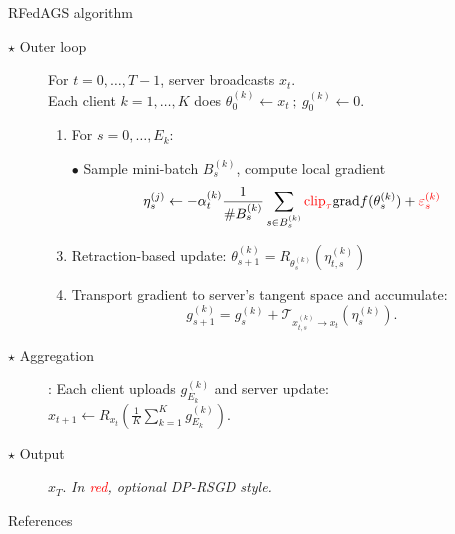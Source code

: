 \documentclass[aspectratio=169,xcolor=dvipsnames]{beamer}
\begin{document}
\begin{frame}{RFedAGS algorithm}
\begin{description}
\item[$\star$ Outer loop] For $t=0,\dots, T-1$, server broadcasts $x_t$. \\Each client $k=1,\dots, K$ does $\theta_{0}^{(k)} \leftarrow x_t~;~g_{0}^{(k)}\leftarrow 0$.
\begin{enumerate}
\item For $s=0,\dots, E_k$: 
\item[$\bullet$] Sample mini-batch $B_{s}^{(k)}$, compute local gradient
$$\eta_{s}^{(j)}\leftarrow -\alpha_t^{(k)}\frac{1}{\#B_s^{(k)}}\sum_{s\in B_{s}^{(k)}}\textcolor{red}{\text{clip}_{\tau}}\text{grad}f(\theta_{s}^{(k)})+\textcolor{red}{\varepsilon_{s}^{(k)}}$$
\item Retraction-based update: $\theta_{s+1}^{(k)}=R_{\theta_{s}^{(k)}}(\eta_{t,s}^{(k)})$
\item Transport gradient to server's tangent space and accumulate:
$$g_{s+1}^{(k)}=g_{s}^{(k)}+\mathcal{T}_{ x_{t,s}^{(k)}\to x_t}(\eta_{s}^{(k)}).$$
\end{enumerate}
\item[$\star$ Aggregation]:
 Each client uploads $g_{E_k}^{(k)}$ and server update: $x_{t+1}\leftarrow R_{x_t}\left(\frac{1}{K}\sum_{k=1}^{K}g_{E_k}^{(k)}\right).$
\item[$\star$ Output] $x_T$. \textit{In \textcolor{red}{red}, optional DP-RSGD style.}
\end{description}

\end{frame}

\begin{frame}{References}
\tiny


\end{frame}
\end{document}
